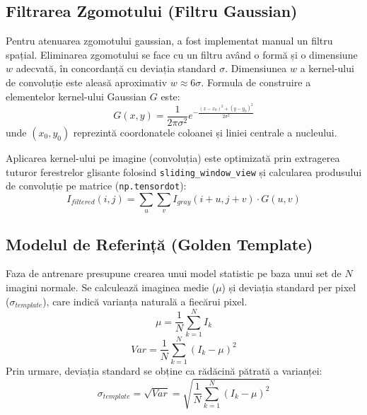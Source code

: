 \documentclass[12pt, a4paper]{article}
\begin{document}
\subsection{Filtrarea Zgomotului (Filtru Gaussian)}
Pentru atenuarea zgomotului gaussian, a fost implementat manual un filtru spațial. Eliminarea zgomotului se face cu un filtru având o formă și o dimensiune $w$ adecvată, în concordanță cu deviația standard $\sigma$. Dimensiunea $w$ a kernel-ului de convoluție este aleasă aproximativ $w \approx 6\sigma$. Formula de construire a elementelor kernel-ului Gaussian $G$ este:
\begin{equation}
    G(x, y) = \frac{1}{2\pi\sigma^2} e^{-\frac{(x-x_0)^2+(y-y_0)^2}{2\sigma^2}}
\end{equation}
unde $(x_0, y_0)$ reprezintă coordonatele coloanei și liniei centrale a nucleului.

Aplicarea kernel-ului pe imagine (convoluția) este optimizată prin extragerea tuturor ferestrelor glisante folosind \texttt{sliding\_window\_view} și calcularea produsului de convoluție pe matrice (\texttt{np.tensordot}):
\begin{equation}
    I_{filtered}(i, j) = \sum_{u} \sum_{v} I_{gray}(i+u, j+v) \cdot G(u, v)
\end{equation}

\subsection{Modelul de Referință (Golden Template)}
Faza de antrenare presupune crearea unui model statistic pe baza unui set de $N$ imagini normale. Se calculează imaginea medie ($\mu$) și deviația standard per pixel ($\sigma_{template}$), care indică varianța naturală a fiecărui pixel.
\begin{equation}
    \mu = \frac{1}{N} \sum_{k=1}^{N} I_k
\end{equation}
\begin{equation}
    Var = \frac{1}{N} \sum_{k=1}^{N} (I_k - \mu)^2
\end{equation}
Prin urmare, deviația standard se obține ca rădăcină pătrată a varianței:
\begin{equation}
    \sigma_{template} = \sqrt{Var} = \sqrt{\frac{1}{N} \sum_{k=1}^{N} (I_k - \mu)^2}
\end{equation}
\end{document}
